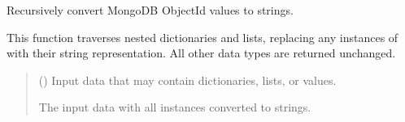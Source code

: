 \documentclass[letterpaper,10pt,english]{sphinxmanual}
\begin{document}
\begin{fulllineitems}
\label{\detokenize{modules/src.pig_sorting_api.main:src.pig_sorting_api.main.convert_objectid_to_str}}
\pysigstartsignatures
\pysiglinewithargsret
{}
{}
{}
\pysigstopsignatures
\sphinxAtStartPar
Recursively convert MongoDB ObjectId values to strings.

\sphinxAtStartPar
This function traverses nested dictionaries and lists, replacing
any instances of  with their string representation.
All other data types are returned unchanged.
\begin{quote}\begin{description}
\sphinxAtStartPar
{} ({\hyperref[\detokenize{modules/src.pig_sorting_api.main:src.pig_sorting_api.main.Any}]{}}) \textendash{} Input data that may contain dictionaries, lists,
or  values.

\sphinxAtStartPar
The input data with all  instances converted
to strings.

\sphinxAtStartPar
{\hyperref[\detokenize{modules/src.pig_sorting_api.main:src.pig_sorting_api.main.Any}]{}}

\end{description}\end{quote}

\end{fulllineitems}

\end{document}
